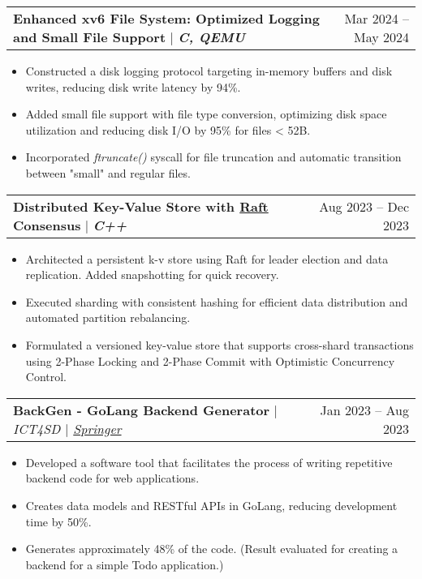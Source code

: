 \documentclass[letterpaper,11pt]{article}
\makeatletter
\newcommand{\resumeItem}[1]{
  \item\small{
    {#1 \vspace{-2pt}}
  }
}
\newcommand{\resumeProjectHeading}[2]{
    \item
    \begin{tabular*}{1.001\textwidth}{l@{\extracolsep{\fill}}r}
      \small#1 & \small #2\\
    \end{tabular*}\vspace{-7pt}
}
\newcommand{\resumeItemListStart}{\begin{itemize}}
\newcommand{\resumeItemListEnd}{\end{itemize}\vspace{-5pt}}
\makeatother
\begin{document}
\resumeProjectHeading
{\textbf{Enhanced xv6 File System: Optimized Logging and Small File Support} $|$ \emph{\textbf{C, QEMU}}}{Mar 2024 -- May 2024}
\resumeItemListStart
\resumeItem{
  Constructed a disk logging protocol targeting in-memory buffers and disk writes, reducing disk write latency by 94\%.
}
\resumeItem{
  Added small file support with file type conversion, optimizing disk space utilization and reducing disk I/O by 95\% for files < 52B.
}
\resumeItem{
  Incorporated \textit{ftruncate()} syscall for file truncation and automatic transition between "small" and regular files.
}
\resumeItemListEnd
\vspace{-17pt}

\resumeProjectHeading
{\textbf{\normalsize{Distributed Key-Value Store with \href{https://raft.github.io/raft.pdf}{Raft} Consensus}} $|$ \emph{\textbf{C++}}}{Aug 2023 -- Dec 2023}
\resumeItemListStart
\resumeItem{Architected a persistent k-v store using Raft for leader election and data replication. Added snapshotting for quick recovery.}
\resumeItem{Executed sharding with consistent hashing for efficient data distribution and automated partition rebalancing.}
\resumeItem{Formulated a versioned key-value store that supports cross-shard transactions using 2-Phase Locking and 2-Phase Commit with Optimistic Concurrency Control.}
\resumeItemListEnd
\vspace{-17pt}

\resumeProjectHeading
{\textbf{\normalsize{BackGen - GoLang Backend Generator}} $|$ \emph{ICT4SD $|$ \href{https://link.springer.com/chapter/10.1007/978-981-99-6568-7_34}{Springer}}}{Jan 2023 -- Aug 2023}
\resumeItemListStart
\resumeItem{Developed a software tool that facilitates the process of writing repetitive backend code for web applications.}
\resumeItem{Creates data models and RESTful APIs in GoLang, reducing development time by 50\%.}
\resumeItem{Generates approximately 48\% of the code. (Result evaluated for creating a backend for a simple Todo application.)}
\resumeItemListEnd
\vspace{-17pt}
\end{document}
